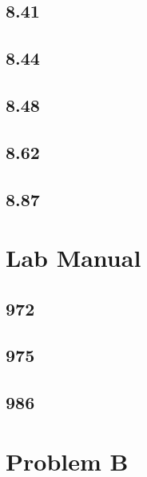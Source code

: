 \documentclass{article}
\begin{document}
\subsection{8.41}

\subsection{8.44}

\subsection{8.48}

\subsection{8.62}

\subsection{8.87}

\section{Lab Manual}

\subsection{972}

\subsection{975}

\subsection{986}

\section{Problem B}
\end{document}
